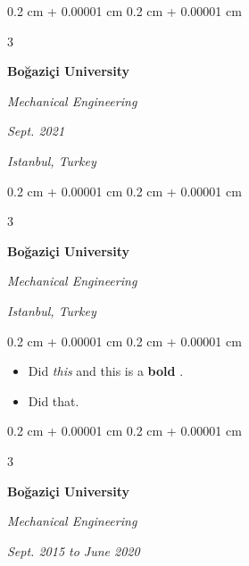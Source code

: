 \documentclass[10pt, letterpaper]{article}
\newenvironment{highlights}{
    \begin{itemize}[
        topsep=0.10 cm,
        parsep=0.10 cm,
        partopsep=0pt,
        itemsep=0pt,
        leftmargin=0.4 cm + 10pt + 0.6 cm
    ]
}{
    \end{itemize}
} %
\newenvironment{onecolentry}{
    \begin{adjustwidth}{
        0.2 cm + 0.00001 cm
    }{
        0.2 cm + 0.00001 cm
    }
}{
    \end{adjustwidth}
} %
\newenvironment{threecolentry}[3][]{
    \onecolentry
    \def\thirdColumn{#3}
    \setcolumnwidth{0.6 cm, \fill, 4.1 cm}
    \begin{paracol}{3}
    #2 \switchcolumn
}{
    \switchcolumn \raggedleft \thirdColumn
    \end{paracol}
    \endonecolentry
} %
\let\hrefWithoutArrow\href
\renewcommand{\href}[2]{\hrefWithoutArrow{#1}{\mbox{\ifthenelse{\equal{#2}{}}{ }{#2 }\raisebox{.15ex}{\footnotesize \faExternalLink*}}}}
\begin{document}
        \vspace{0.2 cm}

        \begin{threecolentry}{
            \vspace*{\fill}
            \textbullet
            \vspace*{3px}
            \vspace*{\fill}
        }{
        \textit{Sept. 2021}
            
        \textit{Istanbul, Turkey}}
            \textbf{Boğaziçi University}

            \textit{Mechanical Engineering}
        \end{threecolentry}



        \vspace{0.2 cm}

        \begin{threecolentry}{
            \vspace*{\fill}
            \textbullet
            \vspace*{3px}
            \vspace*{\fill}
        }{

            
        \textit{Istanbul, Turkey}}
            \textbf{Boğaziçi University}

            \textit{Mechanical Engineering}
        \end{threecolentry}

        \vspace{0.10 cm}
        \begin{onecolentry}
            \begin{highlights}
                \item Did \textit{this} and this is a \textbf{bold} \href{https://example.com}{link}.
                \item Did that.
            \end{highlights}
        \end{onecolentry}


        \vspace{0.2 cm}

        \begin{threecolentry}{
            \vspace*{\fill}
            \textbullet
            \vspace*{3px}
            \vspace*{\fill}
        }{
        \textit{Sept. 2015 to June 2020}
            
        }
            \textbf{Boğaziçi University}

            \textit{Mechanical Engineering}
        \end{threecolentry}
\end{document}

